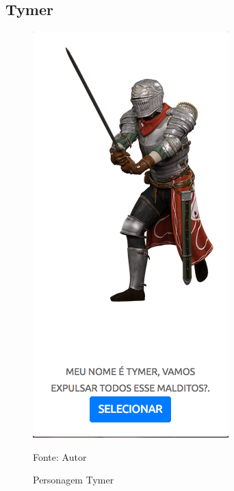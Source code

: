 \subsection{Tymer}
\begin{figure}[h]
	\centering
	\includegraphics[keepaspectratio=true,scale=0.5]{figuras/tymer.png}
	\caption{Personagem Tymer}
	Fonte: Autor
	\label{tymer}
\end{figure}
\clearpage

